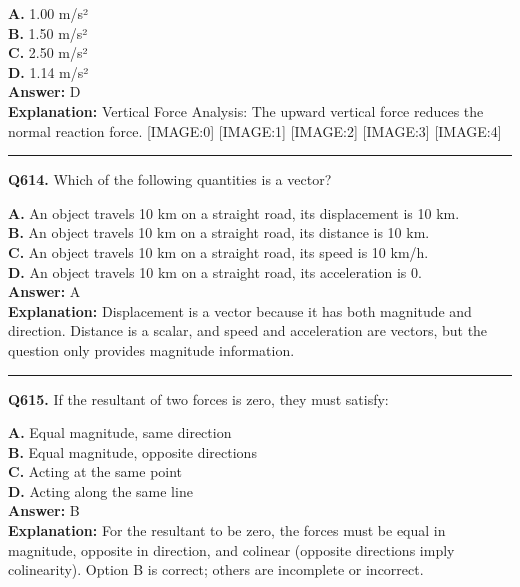 \documentclass[12pt]{article}
\begin{document}
\textbf{A.} 1.00 m/s² \\
\textbf{B.} 1.50 m/s² \\
\textbf{C.} 2.50 m/s² \\
\textbf{D.} 1.14 m/s² \\

\textbf{Answer:} D \\
\textbf{Explanation:} Vertical Force Analysis:
The upward vertical force reduces the normal reaction force.
[IMAGE:0]
[IMAGE:1]
[IMAGE:2]
[IMAGE:3]
[IMAGE:4]

\hrule
\vspace{1em}


\noindent
\textbf{Q614.} Which of the following quantities is a vector?



\textbf{A.} An object travels 10 km on a straight road, its displacement is 10 km. \\
\textbf{B.} An object travels 10 km on a straight road, its distance is 10 km. \\
\textbf{C.} An object travels 10 km on a straight road, its speed is 10 km/h. \\
\textbf{D.} An object travels 10 km on a straight road, its acceleration is 0. \\

\textbf{Answer:} A \\
\textbf{Explanation:} Displacement is a vector because it has both magnitude and direction. Distance is a scalar, and speed and acceleration are vectors, but the question only provides magnitude information.

\hrule
\vspace{1em}


\noindent
\textbf{Q615.} If the resultant of two forces is zero, they must satisfy:



\textbf{A.} Equal magnitude, same direction \\
\textbf{B.} Equal magnitude, opposite directions \\
\textbf{C.} Acting at the same point \\
\textbf{D.} Acting along the same line \\

\textbf{Answer:} B \\
\textbf{Explanation:} For the resultant to be zero, the forces must be equal in magnitude, opposite in direction, and colinear (opposite directions imply colinearity). Option B is correct; others are incomplete or incorrect.
\end{document}
